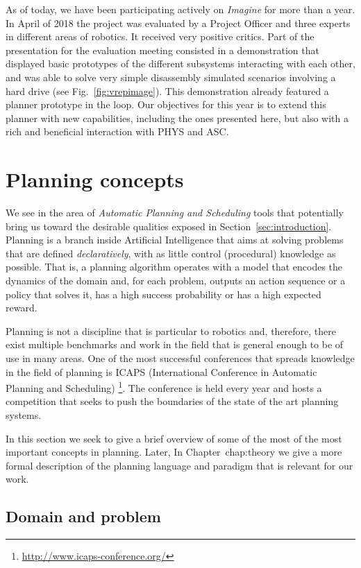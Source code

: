 \documentclass[../root.tex]{subfiles}
\begin{document}
As of today, we have been participating actively on \emph{Imagine} for more
than a year.
In April of 2018 the project was evaluated by a Project Officer and three experts in
different areas of robotics. It received very positive critics. Part of the
presentation for the evaluation meeting consisted in a demonstration that
displayed basic prototypes of the different subsystems interacting with each
other, and was
able to solve very simple disassembly simulated scenarios
involving a
hard drive (see Fig.~\ref{fig:vrepimage}).
This demonstration already featured a planner prototype in the loop.
Our objectives for this year is to extend this planner with new
capabilities, including the ones presented here, but also with
a rich and beneficial interaction with PHYS and ASC.

\section{Planning concepts}

We see in the area of \emph{Automatic Planning and Scheduling}
tools that potentially bring us toward the
desirable qualities exposed in Section~\ref{sec:introduction}.
Planning is a branch inside Artificial
Intelligence that aims at solving problems that are defined
\emph{declaratively}, with as little control (procedural) knowledge
as possible.
That is, a
planning algorithm
operates with a model that encodes the dynamics of the domain and, for
each problem, outputs
an action sequence
or a policy that solves it, has a high success probability or has a high
expected reward.

Planning is not a discipline that is particular to
robotics and, therefore, there exist multiple benchmarks and work in the
field that is general enough to be of use in many areas. One of the
most successful conferences that spreads knowledge in the field of planning is
ICAPS (International Conference in Automatic Planning and Scheduling)
\footnote{\url{http://www.icaps-conference.org/}}. The conference is
held every year and hosts a competition that seeks to push the boundaries
of the state of the art planning systems.

In this section we seek to give a brief overview of some of the most of
the most important concepts in planning. Later, In Chapter~{chap:theory} we
give a more formal description of the planning language and paradigm that
is relevant for our work.

\subsection{Domain and problem}
\end{document}
